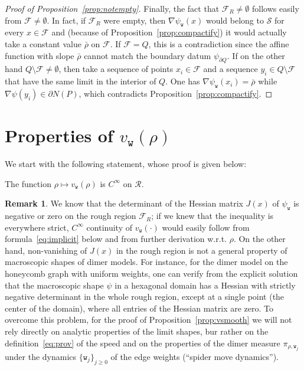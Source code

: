 \documentclass[10pt]{amsart}
\theoremstyle{definition}\newtheorem{defi}[theo]{Definition}\newtheorem{rema}[theo]{Remark}\newtheorem{exam}[theo]{Example}\newtheorem{exem}[theo]{Example}\newtheorem{nota}[theo]{Notation}
\newcommand{\psiw}{\psi_{\mathtt w}}
\newcommand{\ttw}{\mathtt{w}}
\newcommand{\clS}{\mathcal{S}}
\newcommand{\clR}{\mathcal{R}}
\newcommand{\clF}{\mathcal{F}}
\begin{document}
\begin{proof}[Proof of Proposition~\ref{prop:notempty}]
Finally, the fact that $\clF_R\ne\emptyset$ follows easily from $\clF\ne\emptyset$. In fact, if $\clF_R$ were empty, then $\nabla \psi_{\ttw}(x)$ would belong to $\clS$ for every $x\in \clF$ and (because of Proposition~\ref{prop:compactify}) it would actually take a constant value $\bar\rho$ on $\clF$. If $\clF=Q$, this is a contradiction since the affine function with slope $\bar \rho$ cannot match the boundary datum $\psi_{\partial Q}$. If on the other hand $Q\setminus \clF\ne\emptyset$, then take a sequence of points $x_i\in \clF$ and a sequence $y_i \in Q\setminus \clF$ that have the same limit in the interior of $Q$. One has $\nabla\psiw(x_i)=\bar \rho$ while $\nabla\psi(y_i)\in \partial N(P)$, which contradicts Proposition~\ref{prop:compactify}.
\end{proof}


\section{Properties of \texorpdfstring{$v_{\ttw}(\rho)$}{v mathtt w(rho)}} \label{sec:Properties}
\label{sec:proprieta}
We start with the following statement, whose proof is given below:
\begin{prop}\label{prop:vsmooth}
The function $\rho\mapsto v_{\ttw}(\rho)$ is $C^\infty$ on $\clR$.
\end{prop}

\begin{rema}
We know that the determinant of the Hessian matrix $J(x)$ of $\psi_{\ttw}$ is negative or zero on the rough region $\clF_R$; if we knew that the inequality is everywhere strict, $C^\infty$ continuity of $v_{\ttw}(\cdot)$ would easily follow from formula~\eqref{eq:implicit} below and from further derivation w.r.t. $\rho$. On the other hand, non-vanishing of $J(x)$ in the rough region is not a general property of macroscopic shapes of dimer models. For instance, for the dimer model on the honeycomb graph with uniform weights, one can verify from the explicit solution~\cite{CLP98} that the macroscopic shape $\psi$ in a hexagonal domain has a Hessian with strictly negative determinant in the whole rough region, except at a single point (the center of the domain), where all entries of the Hessian matrix are zero. To overcome this problem, for the proof of Proposition~\ref{prop:vsmooth} we will not rely directly on analytic properties of the limit shapes, bur rather on the definition~\eqref{eq:prov} of the speed and on the properties of the dimer measure $\pi_{\rho,\ttw_j}$ under the dynamics $\{\ttw_j\}_{j\ge 0}$ of the edge weights (``spider move dynamics'').
\end{rema}
\end{document}

